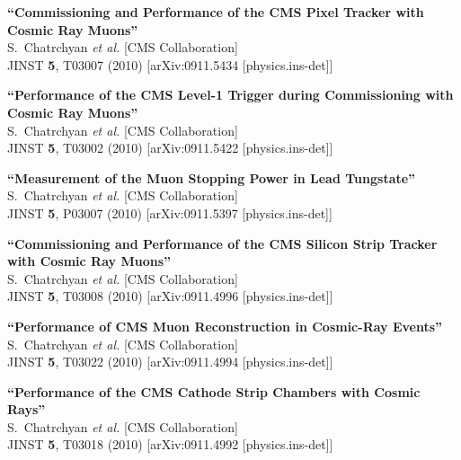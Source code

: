 \documentclass[10pt, a4paper]{article}
\begin{document}
\begin{thebibliography}{599}
{\bf ``Commissioning and Performance of the CMS Pixel Tracker with Cosmic Ray Muons''}
  \\{}S.~Chatrchyan {\it et al.}  [CMS Collaboration]
  \\{}JINST {\bf 5}, T03007 (2010)
  [arXiv:0911.5434 [physics.ins-det]]

{\bf ``Performance of the CMS Level-1 Trigger during Commissioning with Cosmic Ray Muons''}
  \\{}S.~Chatrchyan {\it et al.}  [CMS Collaboration]
  \\{}JINST {\bf 5}, T03002 (2010)
  [arXiv:0911.5422 [physics.ins-det]]

{\bf ``Measurement of the Muon Stopping Power in Lead Tungstate''}
  \\{}S.~Chatrchyan {\it et al.}  [CMS Collaboration]
  \\{}JINST {\bf 5}, P03007 (2010)
  [arXiv:0911.5397 [physics.ins-det]]

{\bf ``Commissioning and Performance of the CMS Silicon Strip Tracker with Cosmic Ray Muons''}
  \\{}S.~Chatrchyan {\it et al.}  [CMS Collaboration]
  \\{}JINST {\bf 5}, T03008 (2010)
  [arXiv:0911.4996 [physics.ins-det]]

{\bf ``Performance of CMS Muon Reconstruction in Cosmic-Ray Events''}
  \\{}S.~Chatrchyan {\it et al.}  [CMS Collaboration]
  \\{}JINST {\bf 5}, T03022 (2010)
  [arXiv:0911.4994 [physics.ins-det]]

{\bf ``Performance of the CMS Cathode Strip Chambers with Cosmic Rays''}
  \\{}S.~Chatrchyan {\it et al.}  [CMS Collaboration]
  \\{}JINST {\bf 5}, T03018 (2010)
  [arXiv:0911.4992 [physics.ins-det]]


\end{thebibliography}
\end{document}
